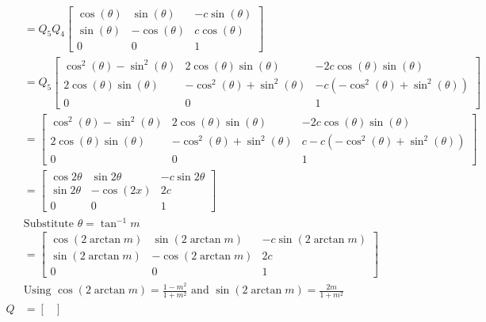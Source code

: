 \documentclass{zc-ust-hw}
\begin{document}
\begin{enumerate}
\begin{enumerate}
\begin{sol}
\begin{align}
              &= Q_5Q_4\begin{bmatrix} 
                \cos(\theta) & \sin(\theta) & -c \sin(\theta) \\
                \sin(\theta) & -\cos(\theta) & c \cos(\theta) \\
                0 & 0 & 1
              \end{bmatrix}  \\
              &= Q_5\begin{bmatrix} 
                \cos^2(\theta) - \sin^2(\theta) & 2\cos(\theta)\sin(\theta) & -2c\cos(\theta)\sin(\theta) \\
                2\cos(\theta)\sin(\theta) & -\cos^2(\theta) + \sin^2(\theta) & -c(-\cos^2(\theta) + \sin^2(\theta)) \\
                0 & 0 & 1
              \end{bmatrix}  \\
              &= \begin{bmatrix} 
                \cos^2(\theta) - \sin^2(\theta) & 2\cos(\theta)\sin(\theta) & -2c\cos(\theta)\sin(\theta) \\
                2\cos(\theta)\sin(\theta) & -\cos^2(\theta) + \sin^2(\theta) & c - c(-\cos^2(\theta) + \sin^2(\theta)) \\
                0 & 0 & 1
              \end{bmatrix} \\
              &= \begin{bmatrix} 
                \cos2\theta & \sin2\theta & -c\sin2\theta \\
                \sin2\theta & -\cos(2x) & 2c \\
                0 & 0 & 1
              \end{bmatrix} \\
              &\text{Substitute } \theta = \tan^{-1}m \nonumber\\
              &= \begin{bmatrix} 
                \cos(2\arctan m) & \sin(2\arctan m) & -c\sin(2\arctan m) \\
                \sin(2\arctan m) & -\cos(2\arctan m) & 2c \\
                0 & 0 & 1
              \end{bmatrix} \\
              &\text{Using } \cos(2\arctan m) = \frac{1-m^2}{1+m^2} \text{ and } \sin(2\arctan m) = \frac{2m}{1+m^2} \nonumber\\
              Q &= \begin{bmatrix} 

\end{bmatrix}
\end{align}
\end{sol}
\end{enumerate}
\end{enumerate}
\end{document}
